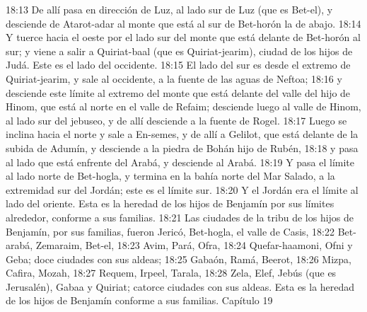 18:13 De allí pasa en dirección de Luz, al lado sur de Luz (que es Bet-el), y desciende de Atarot-adar al monte que está al sur de Bet-horón la de abajo.  
18:14 Y tuerce hacia el oeste por el lado sur del monte que está delante de Bet-horón al sur; y viene a salir a Quiriat-baal (que es Quiriat-jearim), ciudad de los hijos de Judá. Este es el lado del occidente.  
18:15 El lado del sur es desde el extremo de Quiriat-jearim, y sale al occidente, a la fuente de las aguas de Neftoa;  
18:16 y desciende este límite al extremo del monte que está delante del valle del hijo de Hinom, que está al norte en el valle de Refaim; desciende luego al valle de Hinom, al lado sur del jebuseo, y de allí desciende a la fuente de Rogel.  
18:17 Luego se inclina hacia el norte y sale a En-semes, y de allí a Gelilot, que está delante de la subida de Adumín, y desciende a la piedra de Bohán hijo de Rubén,  
18:18 y pasa al lado que está enfrente del Arabá, y desciende al Arabá.  
18:19 Y pasa el límite al lado norte de Bet-hogla, y termina en la bahía norte del Mar Salado, a la extremidad sur del Jordán; este es el límite sur.  
18:20 Y el Jordán era el límite al lado del oriente. Esta es la heredad de los hijos de Benjamín por sus límites alrededor, conforme a sus familias.  
18:21 Las ciudades de la tribu de los hijos de Benjamín, por sus familias, fueron Jericó, Bet-hogla, el valle de Casis,  
18:22 Bet-arabá, Zemaraim, Bet-el,  
18:23 Avim, Pará, Ofra,  
18:24 Quefar-haamoni, Ofni y Geba; doce ciudades con sus aldeas;  
18:25 Gabaón, Ramá, Beerot,  
18:26 Mizpa, Cafira, Mozah,  
18:27 Requem, Irpeel, Tarala,  
18:28 Zela, Elef, Jebús (que es Jerusalén), Gabaa y Quiriat; catorce ciudades con sus aldeas. Esta es la heredad de los hijos de Benjamín conforme a sus familias.  
Capítulo 19

